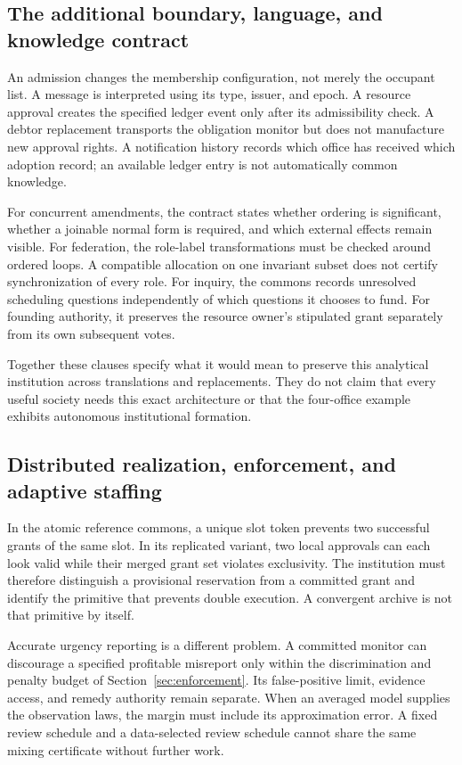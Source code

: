 \documentclass[11pt,letterpaper]{article}
\theoremstyle{plain}
\theoremstyle{definition}
\theoremstyle{remark}
\begin{document}
\subsection{The additional boundary, language, and knowledge contract}
An admission changes the membership configuration, not merely the occupant list. A message is interpreted using its type, issuer, and epoch. A resource approval creates the specified ledger event only after its admissibility check. A debtor replacement transports the obligation monitor but does not manufacture new approval rights. A notification history records which office has received which adoption record; an available ledger entry is not automatically common knowledge.

For concurrent amendments, the contract states whether ordering is significant, whether a joinable normal form is required, and which external effects remain visible. For federation, the role-label transformations must be checked around ordered loops. A compatible allocation on one invariant subset does not certify synchronization of every role. For inquiry, the commons records unresolved scheduling questions independently of which questions it chooses to fund. For founding authority, it preserves the resource owner's stipulated grant separately from its own subsequent votes.

Together these clauses specify what it would mean to preserve this analytical institution across translations and replacements. They do not claim that every useful society needs this exact architecture or that the four-office example exhibits autonomous institutional formation.

\subsection{Distributed realization, enforcement, and adaptive staffing}
In the atomic reference commons, a unique slot token prevents two successful grants of the same slot. In its replicated variant, two local approvals can each look valid while their merged grant set violates exclusivity. The institution must therefore distinguish a provisional reservation from a committed grant and identify the primitive that prevents double execution. A convergent archive is not that primitive by itself.

Accurate urgency reporting is a different problem. A committed monitor can discourage a specified profitable misreport only within the discrimination and penalty budget of Section~\ref{sec:enforcement}. Its false-positive limit, evidence access, and remedy authority remain separate. When an averaged model supplies the observation laws, the margin must include its approximation error. A fixed review schedule and a data-selected review schedule cannot share the same mixing certificate without further work.
\end{document}
